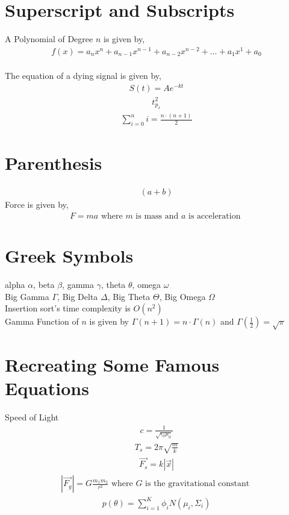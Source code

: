 \documentclass[]{article}
\begin{document}
\section{Superscript and Subscripts}
A Polynomial of Degree $n$ is given by,
\begin{align}
f(x)=a_n x^n+a_{n-1}x^{n-1}+a_{n-2}x^{n-2}+\dots+a_1x^1+a_0
\end{align}\\
The equation of a dying signal is given by,
\begin{align}
    S(t)=Ae^{-kt}
\end{align}
\begin{align}
    t_{p_x}^2
\end{align}
\begin{align}
    \sum_{i=0}^{n}i=\frac{n\cdot\left(n+1\right)}{2}
\end{align}
\section{Parenthesis}
\begin{align*}
\left( a+b\right)
\end{align*}
Force is given by,
\begin{align*}
    F=ma \text{ where \(m\) is mass and \(a\) is acceleration }
\end{align*}
\section{Greek Symbols}
alpha $\alpha$, beta $\beta$, gamma $\gamma$, theta $\theta$, omega $\omega$\\
Big Gamma $\Gamma$, Big Delta $\Delta$, Big Theta $\Theta$, Big Omega $\Omega$\\
Insertion sort's time complexity is $O(n^2)$\\
Gamma Function of $n$ is given by $\Gamma\left(n+1\right)=n\cdot\Gamma\left
(n\right)$ and $\Gamma\left(\frac{1}{2}\right)=\sqrt{\pi}$
\section{Recreating Some Famous Equations}
Speed of Light
\begin{align}
    c=\frac{1}{\sqrt{\epsilon_0\mu_0}}
\end{align}
\begin{align}
    T_s=2\pi\sqrt{\frac{m}{k}}
\end{align}
\begin{align}
    \Vec{F_s}=k|\Vec{x}|
\end{align}
\begin{align}
    |\Vec{F_g}|=G\frac{m_1m_2}{r^2}\text{ where $G$ is the gravitational constant }
\end{align}
\begin{align}
    p\left(\theta\right)=\sum_{i=1}^{K}\phi_iN\left(\mu_i,\Sigma_i\right)
\end{align}
\end{document}
